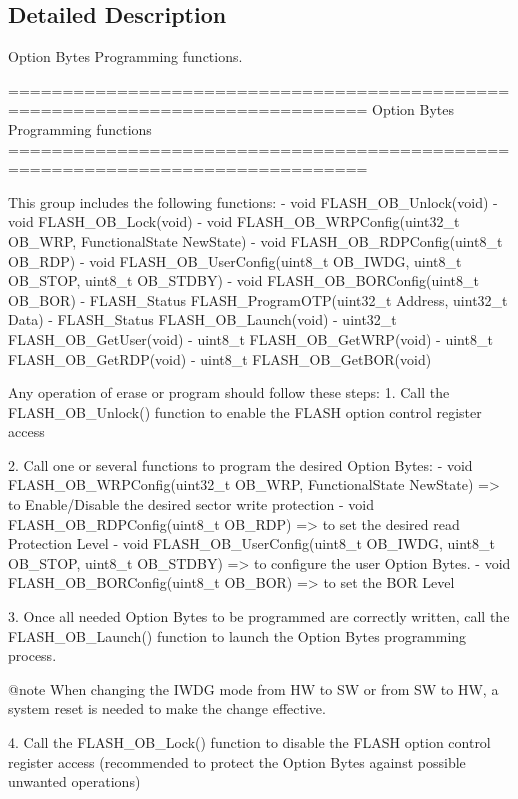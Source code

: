 \subsection{Detailed Description}
Option Bytes Programming functions. \begin{DoxyVerb} ===============================================================================
                        Option Bytes Programming functions
 ===============================================================================  
 
   This group includes the following functions:
   - void FLASH_OB_Unlock(void)
   - void FLASH_OB_Lock(void)
   - void FLASH_OB_WRPConfig(uint32_t OB_WRP, FunctionalState NewState)
   - void FLASH_OB_RDPConfig(uint8_t OB_RDP)
   - void FLASH_OB_UserConfig(uint8_t OB_IWDG, uint8_t OB_STOP, uint8_t OB_STDBY)
   - void FLASH_OB_BORConfig(uint8_t OB_BOR)
   - FLASH_Status FLASH_ProgramOTP(uint32_t Address, uint32_t Data)                         
   - FLASH_Status FLASH_OB_Launch(void)
   - uint32_t FLASH_OB_GetUser(void)                        
   - uint8_t FLASH_OB_GetWRP(void)                      
   - uint8_t FLASH_OB_GetRDP(void)                          
   - uint8_t FLASH_OB_GetBOR(void)
   
   Any operation of erase or program should follow these steps:
   1. Call the FLASH_OB_Unlock() function to enable the FLASH option control register access

   2. Call one or several functions to program the desired Option Bytes:
      - void FLASH_OB_WRPConfig(uint32_t OB_WRP, FunctionalState NewState) => to Enable/Disable 
        the desired sector write protection
      - void FLASH_OB_RDPConfig(uint8_t OB_RDP) => to set the desired read Protection Level
      - void FLASH_OB_UserConfig(uint8_t OB_IWDG, uint8_t OB_STOP, uint8_t OB_STDBY) => to configure 
        the user Option Bytes.
      - void FLASH_OB_BORConfig(uint8_t OB_BOR) => to set the BOR Level              

   3. Once all needed Option Bytes to be programmed are correctly written, call the
      FLASH_OB_Launch() function to launch the Option Bytes programming process.
     
     @note When changing the IWDG mode from HW to SW or from SW to HW, a system 
           reset is needed to make the change effective.  

   4. Call the FLASH_OB_Lock() function to disable the FLASH option control register
      access (recommended to protect the Option Bytes against possible unwanted operations)\end{DoxyVerb}
 

